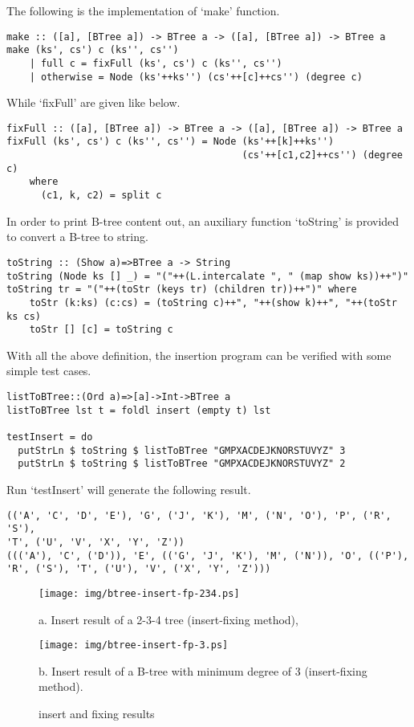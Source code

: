 \documentclass{article}
\begin{document}
The following is the implementation of `make' function.

\begin{lstlisting}
make :: ([a], [BTree a]) -> BTree a -> ([a], [BTree a]) -> BTree a
make (ks', cs') c (ks'', cs'')
    | full c = fixFull (ks', cs') c (ks'', cs'')
    | otherwise = Node (ks'++ks'') (cs'++[c]++cs'') (degree c)
\end{lstlisting}

While `fixFull' are given like below.

\begin{lstlisting}
fixFull :: ([a], [BTree a]) -> BTree a -> ([a], [BTree a]) -> BTree a
fixFull (ks', cs') c (ks'', cs'') = Node (ks'++[k]++ks'')
                                         (cs'++[c1,c2]++cs'') (degree c)
    where
      (c1, k, c2) = split c
\end{lstlisting}

In order to print B-tree content out, an auxiliary function `toString'
is provided to convert a B-tree to string.

\begin{lstlisting}
toString :: (Show a)=>BTree a -> String
toString (Node ks [] _) = "("++(L.intercalate ", " (map show ks))++")"
toString tr = "("++(toStr (keys tr) (children tr))++")" where
    toStr (k:ks) (c:cs) = (toString c)++", "++(show k)++", "++(toStr ks cs)
    toStr [] [c] = toString c
\end{lstlisting}

With all the above definition, the insertion program can be verified with
some simple test cases.

\begin{lstlisting}
listToBTree::(Ord a)=>[a]->Int->BTree a
listToBTree lst t = foldl insert (empty t) lst

testInsert = do
  putStrLn $ toString $ listToBTree "GMPXACDEJKNORSTUVYZ" 3
  putStrLn $ toString $ listToBTree "GMPXACDEJKNORSTUVYZ" 2
\end{lstlisting}

Run `testInsert' will generate the following result.

\begin{verbatim}
(('A', 'C', 'D', 'E'), 'G', ('J', 'K'), 'M', ('N', 'O'), 'P', ('R', 'S'),
'T', ('U', 'V', 'X', 'Y', 'Z'))
((('A'), 'C', ('D')), 'E', (('G', 'J', 'K'), 'M', ('N')), 'O', (('P'),
'R', ('S'), 'T', ('U'), 'V', ('X', 'Y', 'Z')))
\end{verbatim}

\begin{figure}[htbp]
  \begin{center}
    \texttt{[image: img/btree-insert-fp-234.ps]}

    a. Insert result of a 2-3-4 tree (insert-fixing method),

    \texttt{[image: img/btree-insert-fp-3.ps]}

    b. Insert result of a B-tree with minimum degree of 3 (insert-fixing method).
    \caption{insert and fixing results} \label{fig:btree-insert-fp}
  \end{center}
\end{figure}
\end{document}
